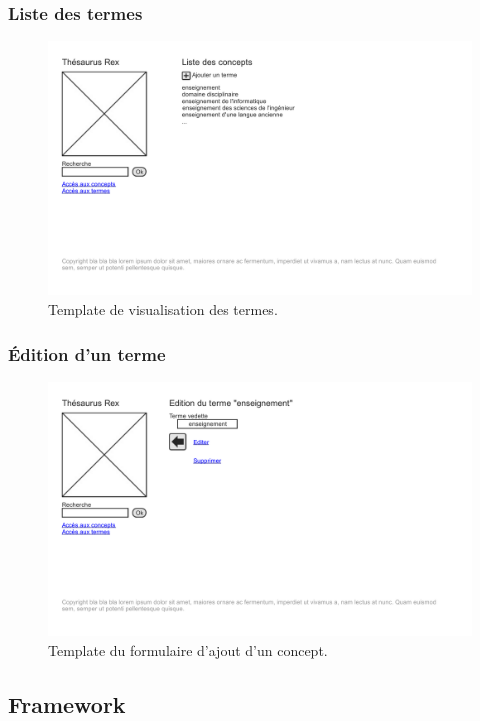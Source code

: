 \subsubsection{Liste des termes}
\begin{figure}[H]
\begin{center}
\includegraphics[width=\textwidth]{files/template_termes}
\end{center}
\caption{Template de visualisation des termes.}
\end{figure}

\subsubsection{Édition d'un terme}
\begin{figure}[H]
\begin{center}
\includegraphics[width=\textwidth]{files/template_terme_edit}
\end{center}
\caption{Template du formulaire d'ajout d'un concept.}
\end{figure}


\subsection{Framework}